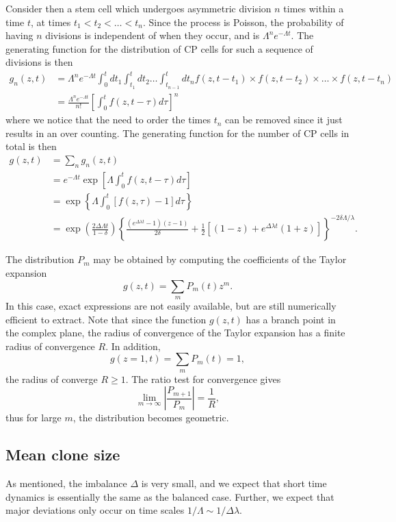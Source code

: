 \documentclass[10pt,UKenglish]{article}
\begin{document}
Consider then a stem cell which undergoes asymmetric division $n$ times within a time $t$, at times $t_1 < t_2 < \ldots < t_n$. Since the process is Poisson, the probability of having $n$ divisions is independent of when they occur, and is $\Lambda^n e^{-\Lambda t}$. The generating function for the distribution of CP cells for such a sequence of divisions is then
\begin{align*}
g_n(z,t) &= \Lambda^n e^{-\Lambda t} \int_0^t dt_1 \int_{t_1}^t dt_2 \ldots \int_{t_{n-1}}^t dt_n f(z,t-t_1) \times f(z,t-t_2) \times \ldots \times f(z,t-t_n) \\
 &= \frac{\Lambda^n e^{-\Lambda t}}{n!} \left[\int_0^t f(z,t-\tau) d\tau \right]^n
\end{align*}
where we notice that the need to order the times $t_n$ can be removed since it just results in an over counting. The generating function for the number of CP cells in total is then
\begin{align*}
g(z,t) &= \sum_n g_n(z,t) \\
 &= e^{-\Lambda t} \exp\left[\Lambda \int_0^t f(z,t-\tau) d\tau \right] \\
 &= \exp\left\{\Lambda \int_0^t \left[f(z,\tau) - 1\right] d\tau \right\} \\
 &= \exp\left(\frac{2 \Delta \Lambda t}{1-\delta}\right) \left\{ \frac{\left(e^{\Delta \lambda t}-1 \right)(z-1)}{2\delta} + \frac{1}{2}\left[(1-z) + e^{\Delta \lambda t}(1+z) \right]\right\}^{-2\delta\Lambda/\lambda}.
\end{align*}

The distribution $P_m$ may be obtained by computing the coefficients of the Taylor expansion $$g(z,t) = \sum_m P_m(t) z^m.$$ In this case, exact expressions are not easily available, but are still numerically efficient to extract. Note that since the function $g(z,t)$ has a branch point in the complex plane, the radius of convergence of the Taylor expansion has a finite radius of convergence $R$. In addition, $$g(z=1,t) = \sum_m P_m(t) = 1,$$ the radius of converge $R \ge 1$. The ratio test for convergence gives $$\lim_{m\rightarrow \infty} \left| \frac{P_{m+1}}{P_m} \right| = \frac{1}{R},$$ thus for large $m$, the distribution becomes geometric.

\subsection{Mean clone size}

As mentioned, the imbalance $\Delta$ is very small, and we expect that short time dynamics is essentially the same as the balanced case. Further, we expect that major deviations only occur on time scales $1/\Lambda \sim 1/\Delta \lambda$.
\end{document}
